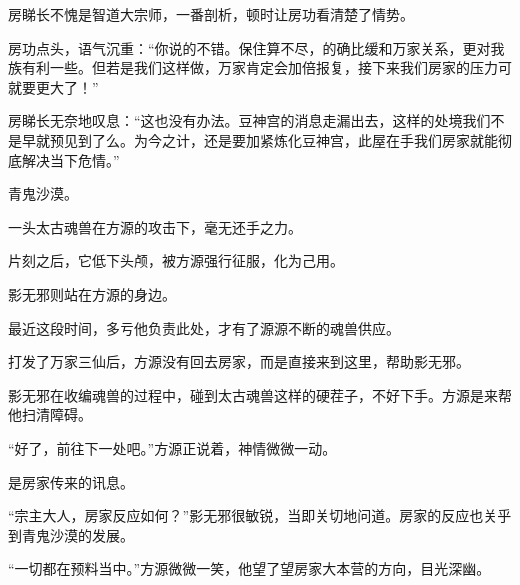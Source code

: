 \begin{this_body}
房睇长不愧是智道大宗师，一番剖析，顿时让房功看清楚了情势。

房功点头，语气沉重：“你说的不错。保住算不尽，的确比缓和万家关系，更对我族有利一些。但若是我们这样做，万家肯定会加倍报复，接下来我们房家的压力可就要更大了！”

房睇长无奈地叹息：“这也没有办法。豆神宫的消息走漏出去，这样的处境我们不是早就预见到了么。为今之计，还是要加紧炼化豆神宫，此屋在手我们房家就能彻底解决当下危情。”

青鬼沙漠。

一头太古魂兽在方源的攻击下，毫无还手之力。

片刻之后，它低下头颅，被方源强行征服，化为己用。

影无邪则站在方源的身边。

最近这段时间，多亏他负责此处，才有了源源不断的魂兽供应。

打发了万家三仙后，方源没有回去房家，而是直接来到这里，帮助影无邪。

影无邪在收编魂兽的过程中，碰到太古魂兽这样的硬茬子，不好下手。方源是来帮他扫清障碍。

“好了，前往下一处吧。”方源正说着，神情微微一动。

是房家传来的讯息。

“宗主大人，房家反应如何？”影无邪很敏锐，当即关切地问道。房家的反应也关乎到青鬼沙漠的发展。

“一切都在预料当中。”方源微微一笑，他望了望房家大本营的方向，目光深幽。

\end{this_body}

